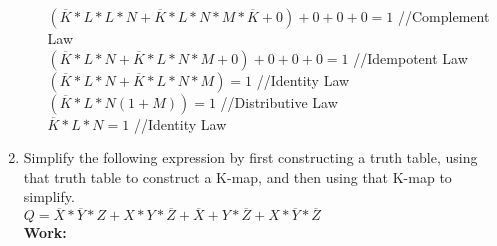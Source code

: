 \documentclass[11pt]{article}
\begin{document}
\begin{enumerate}
\begin{enumerate}[(a)]
            $(\overline{K}* L * L * N + \overline{K} * L * N * M * \overline{K} + 0) + 0 + 0 + 0= 1$ //Complement Law\\
            $(\overline{K} * L * N + \overline{K} * L * N * M + 0) + 0 + 0 + 0 = 1$ //Idempotent Law\\
            $(\overline{K} * L * N + \overline{K} * L * N * M) = 1$ //Identity Law\\
            $(\overline{K} * L * N(1 + M)) = 1$ //Distributive Law\\
            $\overline{K} * L * N = 1$ //Identity Law
            \begin{center}
            \end{center}
    \end{enumerate}

    \item Simplify the following expression by first constructing a truth table, using that truth table to
    construct a K-map, and then using that K-map to simplify.\\
    $Q = \overline{X} * \overline{Y} * Z + X * Y * \overline{Z} + \overline{X} + Y * \overline{Z} + X * \overline{Y} * \overline{Z}$\\
    \textbf{Work:}
\end{enumerate}
\end{document}
